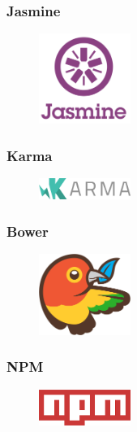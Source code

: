 \subsubsection{Jasmine}
\begin{figure}
\includegraphics[width=3cm]{img/mobile-app/logos/jasmine.png}
\end{figure} 
\cite{jasmine}

\subsubsection{Karma}
\begin{figure}
\includegraphics[width=3cm]{img/mobile-app/logos/karma.png}
\end{figure} 


\subsubsection{Bower}
\begin{figure}
\includegraphics[width=3cm]{img/mobile-app/logos/bower.png}
\end{figure} 


\subsubsection{NPM}
\begin{figure}
\includegraphics[width=3cm]{img/mobile-app/logos/npm.png}
\end{figure} 


